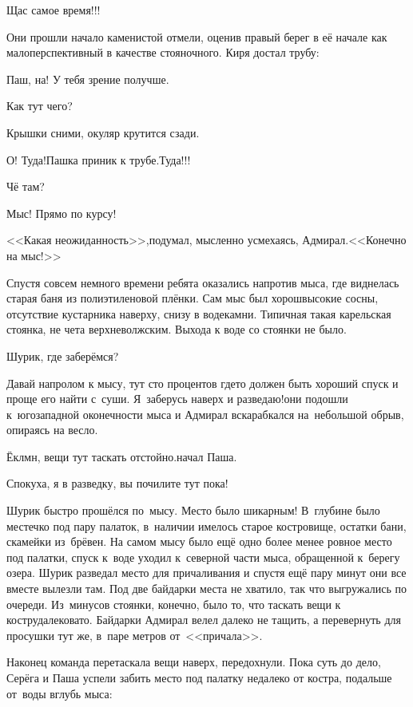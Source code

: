 \diagdash Щас самое время!!!

Они прошли начало каменистой отмели, оценив правый берег в её начале как малоперспективный в качестве стояночного. Киря достал трубу:

\diagdash Паш, на! У тебя зрение получше.

\diagdash Как тут чего?

\diagdash Крышки сними, окуляр крутится сзади.

\diagdash О! Туда!\mdash Пашка приник к трубе.\mdash Туда!!!

\diagdash Чё там?

\diagdash Мыс! Прямо по курсу!

<<Какая неожиданность>>,\mdash подумал, мысленно усмехаясь, Адмирал.\mdash <<Конечно на мыс!>>

Спустя совсем немного времени ребята оказались напротив мыса, где виднелась старая баня из полиэтиленовой плёнки. Сам мыс был хорош\mdash высокие сосны, отсутствие кустарника наверху, снизу в воде\mdash камни. Типичная такая карельская стоянка, не чета верхневолжским. Выхода к воде со стоянки не было. 

\diagdash Шурик, где заберёмся?

\diagdash Давай напролом к мысу, тут сто процентов где\sdash то должен быть хороший спуск и проще его найти с~суши. Я~заберусь наверх и разведаю!\mdash они подошли к~юго\sdash западной оконечности мыса и Адмирал вскарабкался на~небольшой обрыв, опираясь на весло.

\diagdash Ёклмн, вещи тут таскать отстойно.\mdash начал Паша. 

\diagdash Спокуха, я в разведку, вы почилите тут пока! 

Шурик быстро прошёлся по~мысу. Место было шикарным! В~глубине было местечко под пару палаток, в~наличии имелось старое костровище, остатки бани, скамейки из~брёвен. На самом мысу было ещё одно более менее ровное место под палатки, спуск к~воде уходил к~северной части мыса, обращенной к~берегу озера. Шурик разведал место для причаливания и спустя ещё пару минут они все вместе вылезли там. Под две байдарки места не хватило, так что выгружались по очереди. Из~минусов стоянки, конечно, было то, что таскать вещи к костру\mdash далековато. Байдарки Адмирал велел далеко не тащить, а перевернуть для просушки тут же, в~паре метров от~<<причала>>.

Наконец команда перетаскала вещи наверх, передохнули. Пока суть до дело, Серёга и Паша успели забить место под палатку недалеко от костра, подальше от~воды вглубь мыса:


